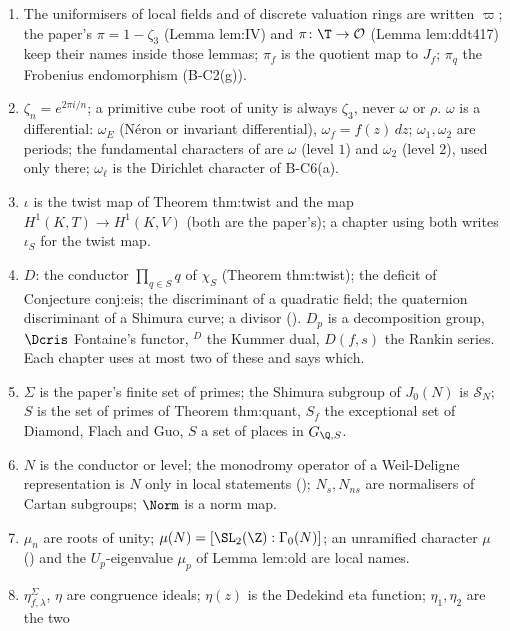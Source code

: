 \begin{convention}\label{conv:notation:bc15}
\leavevmode
\begin{enumerate}[label=(\alph*)]
\item The uniformisers of local fields and of discrete valuation rings are written $\varpi$; the paper's $\pi=1-\zeta_3$ (Lemma lem:IV) and
$\pi\colon\T\to\mathcal O$ (Lemma lem:ddt417) keep their names inside those lemmas; $\pi_f$ is the quotient map to $J_f$; $\pi_q$ the
Frobenius endomorphism (B-C2(g)).
\item $\zeta_n=e^{2\pi i/n}$; a primitive cube root of unity is always $\zeta_3$, never $\omega$ or $\rho$. $\omega$ is a differential:
$\omega_E$ (N\'eron or invariant differential), $\omega_f=f(z)\,dz$; $\omega_1,\omega_2$ are periods; the fundamental characters of
 are $\omega$ (level $1$) and $\omega_2$ (level $2$), used only there; $\omega_\ell$ is the Dirichlet
character of B-C6(a).
\item $\iota$ is the twist map of Theorem thm:twist and the map $H^1(K,T)\to H^1(K,V)$ (both are the paper's); a chapter using
both writes $\iota_S$ for the twist map.
\item $D$: the conductor $\prod_{q\in S}q$ of $\chi_S$ (Theorem thm:twist); the deficit of Conjecture conj:eis; the discriminant of a
quadratic field; the quaternion discriminant of a Shimura curve; a divisor (). $D_p$ is a decomposition group,
$\Dcris$ Fontaine's functor, ${}^D$ the Kummer dual, $D(f,s)$ the Rankin series. Each chapter uses at most two of these and says
which.
\item $\Sigma$ is the paper's finite set of primes; the Shimura subgroup of $J_0(N)$ is $\mathcal S_N$; $S$ is the set of primes of
Theorem thm:quant, $S_f$ the exceptional set of Diamond, Flach and Guo, $S$ a set of places in $G_{\Q,S}$.
\item $N$ is the conductor or level; the monodromy operator of a Weil-Deligne representation is $N$ only in local statements
(); $N_s,N_{ns}$ are normalisers of Cartan subgroups; $\Norm$ is a norm map.
\item $\mu_n$ are roots of unity; $\mu(N)=[\SL_2(\Z):\Gamma_0(N)]$; an unramified character $\mu$ () and the
$U_p$-eigenvalue $\mu_p$ of Lemma lem:old are local names.
\item $\eta^\Sigma_{f,\lambda}$, $\eta$ are congruence ideals; $\eta(z)$ is the Dedekind eta function; $\eta_1,\eta_2$ are the two

\end{enumerate}
\end{convention}
